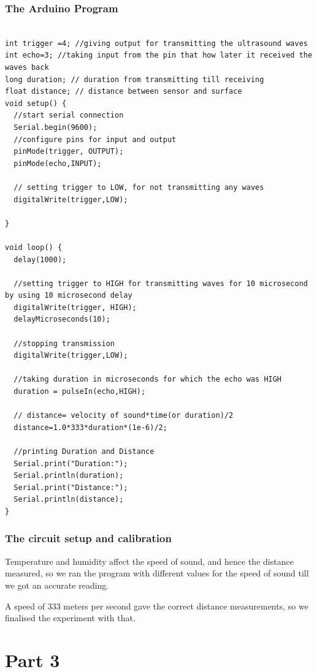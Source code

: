 \documentclass[12pt]{article}
\begin{document}
\subsubsection*{The Arduino Program}
\begin{lstlisting}[style=Cstyle]

int trigger =4; //giving output for transmitting the ultrasound waves
int echo=3; //taking input from the pin that how later it received the waves back
long duration; // duration from transmitting till receiving
float distance; // distance between sensor and surface
void setup() {
  //start serial connection
  Serial.begin(9600);
  //configure pins for input and output
  pinMode(trigger, OUTPUT);
  pinMode(echo,INPUT);

  // setting trigger to LOW, for not transmitting any waves
  digitalWrite(trigger,LOW);

}

void loop() {
  delay(1000);

  //setting trigger to HIGH for transmitting waves for 10 microsecond by using 10 microsecond delay
  digitalWrite(trigger, HIGH);
  delayMicroseconds(10);

  //stopping transmission
  digitalWrite(trigger,LOW);

  //taking duration in microseconds for which the echo was HIGH
  duration = pulseIn(echo,HIGH);

  // distance= velocity of sound*time(or duration)/2
  distance=1.0*333*duration*(1e-6)/2;
  
  //printing Duration and Distance
  Serial.print("Duration:");
  Serial.println(duration);
  Serial.print("Distance:");
  Serial.println(distance);
}

\end{lstlisting}



\subsubsection*{The circuit setup and calibration}
Temperature and humidity affect the speed of sound, and hence the distance measured, so we ran the program with different values for the speed of sound till we got an accurate reading.


A speed of 333 meters per second gave the correct distance measurements, so we finalised the experiment with that.


\section*{Part 3}
\end{document}
